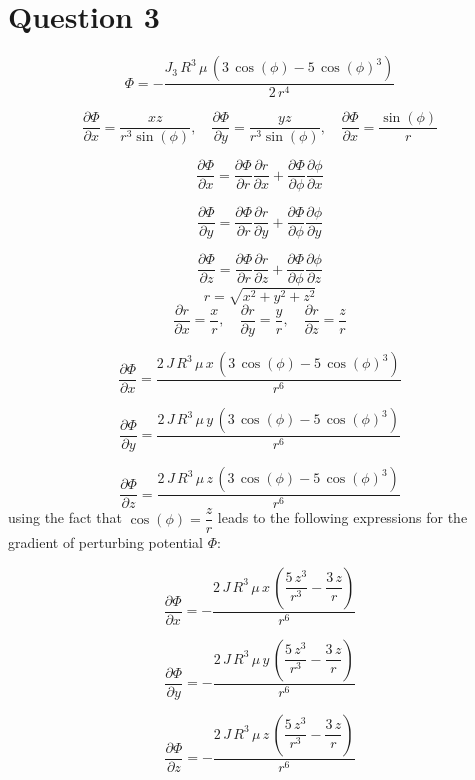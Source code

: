 \section{Question 3}
$$\Phi = -\dfrac{J_3\,R^3 \,\mu \,{\left(3\,\cos \left(\phi \right)-5\,{\cos \left(\phi \right)}^3 \right)}}{2\,r^4 }$$


$$
\dfrac{\partial \Phi}{\partial x} = \dfrac{xz}{r^3\sin(\phi)}, \quad \dfrac{\partial \Phi}{\partial y} = \dfrac{yz}{r^3\sin(\phi)}, \quad \dfrac{\partial \Phi}{\partial x} = \dfrac{\sin(\phi)}{r}
$$

$$
\dfrac{\partial \Phi}{\partial x} = \dfrac{\partial \Phi}{\partial r} \dfrac{\partial r}{\partial x} +
\dfrac{\partial \Phi}{\partial \phi} \dfrac{\partial \phi}{\partial x}
$$

$$
\dfrac{\partial \Phi}{\partial y} = \dfrac{\partial \Phi}{\partial r} \dfrac{\partial r}{\partial y} +
\dfrac{\partial \Phi}{\partial \phi} \dfrac{\partial \phi}{\partial y}
$$

$$
\dfrac{\partial \Phi}{\partial z} = \dfrac{\partial \Phi}{\partial r} \dfrac{\partial r}{\partial z} +
\dfrac{\partial \Phi}{\partial \phi} \dfrac{\partial \phi}{\partial z}
$$
$$
r = \sqrt{x^2+y^2+z^2}
$$
$$
\dfrac{\partial r}{\partial x} = \dfrac xr, \quad \dfrac{\partial r}{\partial y} = \dfrac yr, \quad \dfrac{\partial r}{\partial z} = \dfrac zr
$$

$$
\dfrac{\partial \Phi}{\partial x} = \dfrac{2\,J\,R^3 \,\mu \,x\,{\left(3\,\cos \left(\phi \right)-5\,{\cos \left(\phi \right)}^3 \right)}}{r^6 }
$$

$$
\dfrac{\partial \Phi}{\partial y} = \dfrac{2\,J\,R^3 \,\mu \,y\,{\left(3\,\cos \left(\phi \right)-5\,{\cos \left(\phi \right)}^3 \right)}}{r^6 }
$$

$$
\dfrac{\partial \Phi}{\partial z} = \dfrac{2\,J\,R^3 \,\mu \,z\,{\left(3\,\cos \left(\phi \right)-5\,{\cos \left(\phi \right)}^3 \right)}}{r^6 }
$$
using the fact that $\cos(\phi) = \dfrac{z}{r}$ leads to the following expressions for the gradient of perturbing potential $\Phi$:

$$
\dfrac{\partial \Phi}{\partial x} = -\dfrac{2\,J\,R^3 \,\mu \,x\,{\left(\dfrac{5\,z^3 }{r^3 }-\dfrac{3\,z}{r}\right)}}{r^6 }
$$

$$
\dfrac{\partial \Phi}{\partial y} = -\dfrac{2\,J\,R^3 \,\mu \,y\,{\left(\dfrac{5\,z^3 }{r^3 }-\dfrac{3\,z}{r}\right)}}{r^6 }
$$

$$
\dfrac{\partial \Phi}{\partial z} = -\dfrac{2\,J\,R^3 \,\mu \,z\,{\left(\dfrac{5\,z^3 }{r^3 }-\dfrac{3\,z}{r}\right)}}{r^6 }
$$

